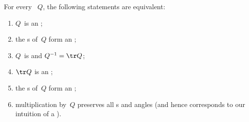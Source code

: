 \begin{theorem} \label{thm:orthog}
For every ~\(Q\),  the following statements are equivalent:
\begin{enumerate}
\item\label{thm:orthog:0} \(Q\)~is an ;
\item\label{thm:orthog:ii} the s of~\(Q\) form an ; 
\item\label{thm:orthog:i} \(Q\)~is  and \(Q^{-1}=\tr Q\);
\item\label{thm:orthog:ia} \(\tr Q\) is an ;
\item\label{thm:orthog:iii} the s of~\(Q\) form an ;
\item\label{thm:orthog:iv} multiplication by~\(Q\) preserves all s and angles (and hence corresponds to our intuition of a ).
\end{enumerate}
\end{theorem}

